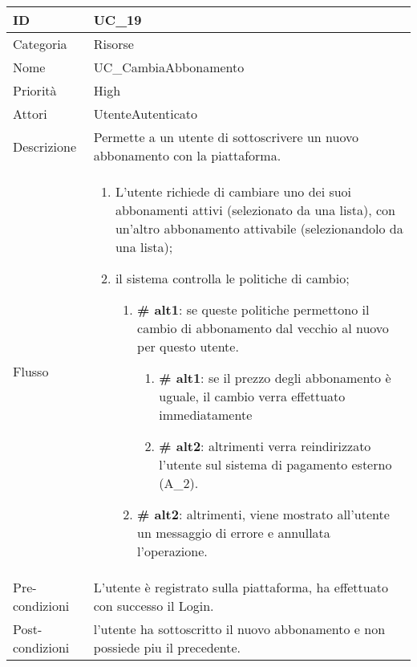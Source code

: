 \begin{center}
\begin{tabular}{ |p{2cm}|p{13cm}|  }
\hline
ID & UC\_19 \\\hline
Categoria & Risorse\\\hline
Nome & UC\_CambiaAbbonamento\\\hline
Priorità & High \\\hline
Attori &  UtenteAutenticato \\\hline
Descrizione & Permette a un utente di sottoscrivere un nuovo abbonamento con la piattaforma.\\\hline
Flusso &  	\begin{enumerate}
			\item L'utente richiede di cambiare uno dei suoi abbonamenti attivi (selezionato da una lista), con un'altro abbonamento attivabile (selezionandolo da una lista);
			\item il sistema controlla le politiche di cambio;
			\begin{enumerate}[  ]
				\item \textbf{\# alt1}: se queste politiche permettono il cambio di abbonamento dal vecchio al nuovo per questo utente.
				\begin{enumerate}[label=\arabic*]
					\item \textbf{\# alt1}: se il prezzo degli abbonamento è uguale, il cambio verra effettuato immediatamente
					\item \textbf{\# alt2}: altrimenti verra reindirizzato l'utente sul sistema di pagamento esterno (A\_2).
				\end{enumerate}
				\item \textbf{\# alt2}: altrimenti, viene mostrato all'utente un messaggio di errore e annullata l'operazione.
			\end{enumerate}
			\end{enumerate}\\\hline
Pre-condizioni & L'utente è registrato sulla piattaforma, ha effettuato con successo il Login.\\\hline
Post-condizioni &  l'utente ha sottoscritto il nuovo abbonamento e non possiede piu il precedente.\\\hline
\end{tabular}
\label{table_use_case:19}\newline




\end{center}
